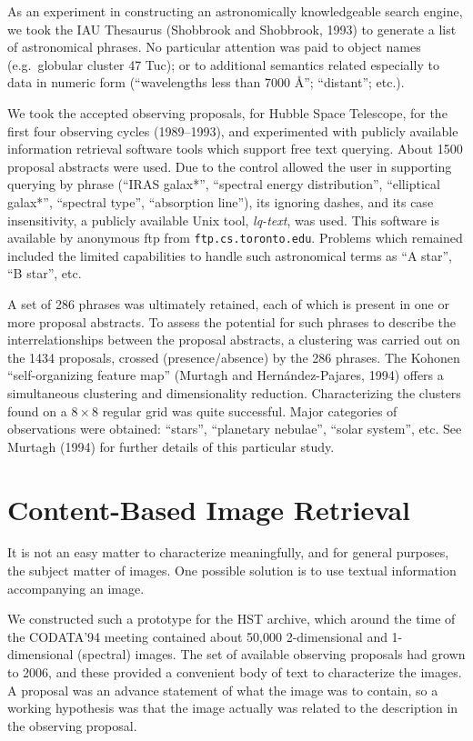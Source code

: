As an experiment in constructing an astronomically knowledgeable search engine,
we took the IAU Thesaurus (Shobbrook and Shobbrook, 1993) to generate a list
of astronomical phrases.  No particular attention was paid to 
object names (e.g.\ globular cluster 47 Tuc); or to additional semantics 
related especially to data in numeric form (``wavelengths less than 7000 \AA'';
``distant''; etc.).  

We took the accepted observing proposals, for Hubble Space Telescope, for 
the first four observing 
cycles (1989--1993), and experimented with publicly available 
information retrieval software tools which support free text querying.  
About 1500 proposal abstracts were used.  Due to the control allowed the
user in supporting querying by phrase (``IRAS galax*'', ``spectral energy
distribution'', ``elliptical galax*'', ``spectral type'', ``absorption line''),
its ignoring dashes, and its case insensitivity, a 
publicly available Unix tool, {\it lq-text}, was 
used.  This software is available by anonymous ftp from
{\tt ftp.cs.toronto.edu}.  Problems which  remained included the limited
capabilities to handle such astronomical 
terms as ``A star'', ``B star'', etc. 

A set of 286 phrases was ultimately retained, each of which is present 
in one or more
proposal abstracts.  To assess the potential for such phrases to describe
the interrelationships between the proposal abstracts, a clustering was 
carried out on the 1434 proposals, crossed (presence/absence) by the 
286 phrases.  The Kohonen ``self-organizing feature map'' 
(Murtagh and Hern\'andez-Pajares, 1994) offers a 
simultaneous clustering and dimensionality reduction.  Characterizing the 
clusters found on a $8 \times 8$ regular grid was quite successful.  Major
categories of observations were obtained: ``stars'', ``planetary nebulae'',
``solar system'', etc.  
See Murtagh (1994) for further details of this particular study.

\section{Content-Based Image Retrieval}

It is not an easy matter  to characterize meaningfully, and for general 
purposes, the subject matter of images. One possible solution is to use 
textual 
information accompanying an image.

We constructed such a prototype for the HST archive, which around the time
of the CODATA'94 meeting contained about 50,000 2-dimensional and 
1-dimensional (spectral) images.  The set of available observing proposals
had grown to 2006, and these provided a convenient body of text to 
characterize the images.  A proposal was an advance statement of what the 
image was to contain, so a working hypothesis was that the image actually
was related to the description in the observing proposal.  

